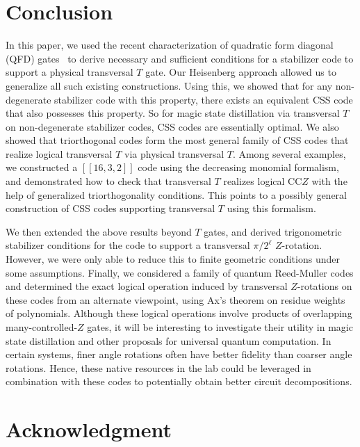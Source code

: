 \documentclass[twoside,romanappendices]{IEEEtran}
\newcommand{\llbr}{[\![}
\newcommand{\rrbr}{]\!]}
\begin{document}
\section{Conclusion}
\label{sec:conclusion}


In this paper, we used the recent characterization of quadratic form diagonal (QFD) gates~\cite{Rengaswamy-pra19} to derive necessary and sufficient conditions for a stabilizer code to support a physical transversal $T$ gate.
Our Heisenberg approach allowed us to generalize all such existing constructions.
Using this, we showed that for any non-degenerate stabilizer code with this property, there exists an equivalent CSS code that also possesses this property.
So for magic state distillation via transversal $T$ on non-degenerate stabilizer codes, CSS codes are essentially optimal.
We also showed that triorthogonal codes form the most general family of CSS codes that realize logical transversal $T$ via physical transversal $T$.
Among several examples, we constructed a $\llbr 16,3,2 \rrbr$ code using the decreasing monomial formalism, and demonstrated how to check that transversal $T$ realizes logical CC$Z$ with the help of generalized triorthogonality conditions.
This points to a possibly general construction of CSS codes supporting transversal $T$ using this formalism.

We then extended the above results beyond $T$ gates, and derived trigonometric stabilizer conditions for the code to support a transversal $\pi/2^{\ell}$ $Z$-rotation.
However, we were only able to reduce this to finite geometric conditions under some assumptions. 
Finally, we considered a family of quantum Reed-Muller codes and determined the exact logical operation induced by transversal $Z$-rotations on these codes from an alternate viewpoint, using Ax's theorem on residue weights of polynomials.
Although these logical operations involve products of overlapping many-controlled-$Z$ gates, it will be interesting to investigate their utility in magic state distillation and other proposals for universal quantum computation.
In certain systems, finer angle rotations often have better fidelity than coarser angle rotations. 
Hence, these native resources in the lab could be leveraged in combination with these codes to potentially obtain better circuit decompositions. 



\section*{Acknowledgment}
\end{document}
